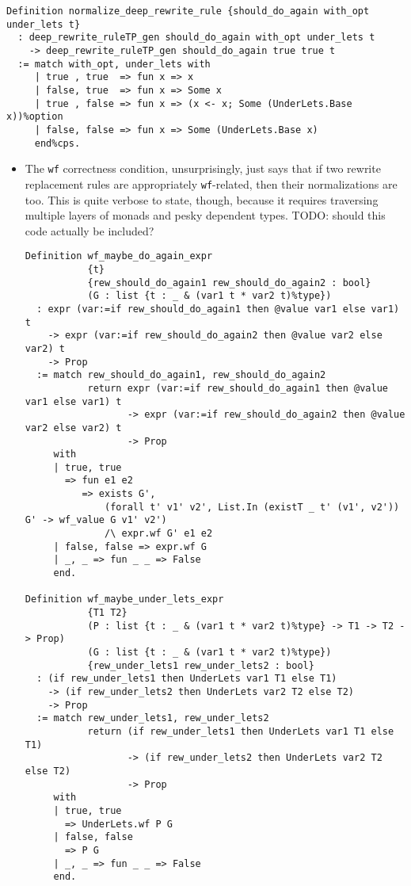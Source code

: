 \begin{itemize}
\begin{itemize}
\begin{verbatim}
Definition normalize_deep_rewrite_rule {should_do_again with_opt under_lets t}
  : deep_rewrite_ruleTP_gen should_do_again with_opt under_lets t
    -> deep_rewrite_ruleTP_gen should_do_again true true t
  := match with_opt, under_lets with
     | true , true  => fun x => x
     | false, true  => fun x => Some x
     | true , false => fun x => (x <- x; Some (UnderLets.Base x))%option
     | false, false => fun x => Some (UnderLets.Base x)
     end%cps.
\end{verbatim}

    \begin{itemize}
    \item
      The \texttt{wf} correctness condition, unsurprisingly, just says
      that if two rewrite replacement rules are appropriately
      \texttt{wf}-related, then their normalizations are too. This is
      quite verbose to state, though, because it requires traversing
      multiple layers of monads and pesky dependent types. TODO: should
      this code actually be included?

\begin{verbatim}
Definition wf_maybe_do_again_expr
           {t}
           {rew_should_do_again1 rew_should_do_again2 : bool}
           (G : list {t : _ & (var1 t * var2 t)%type})
  : expr (var:=if rew_should_do_again1 then @value var1 else var1) t
    -> expr (var:=if rew_should_do_again2 then @value var2 else var2) t
    -> Prop
  := match rew_should_do_again1, rew_should_do_again2
           return expr (var:=if rew_should_do_again1 then @value var1 else var1) t
                  -> expr (var:=if rew_should_do_again2 then @value var2 else var2) t
                  -> Prop
     with
     | true, true
       => fun e1 e2
          => exists G',
              (forall t' v1' v2', List.In (existT _ t' (v1', v2')) G' -> wf_value G v1' v2')
              /\ expr.wf G' e1 e2
     | false, false => expr.wf G
     | _, _ => fun _ _ => False
     end.

Definition wf_maybe_under_lets_expr
           {T1 T2}
           (P : list {t : _ & (var1 t * var2 t)%type} -> T1 -> T2 -> Prop)
           (G : list {t : _ & (var1 t * var2 t)%type})
           {rew_under_lets1 rew_under_lets2 : bool}
  : (if rew_under_lets1 then UnderLets var1 T1 else T1)
    -> (if rew_under_lets2 then UnderLets var2 T2 else T2)
    -> Prop
  := match rew_under_lets1, rew_under_lets2
           return (if rew_under_lets1 then UnderLets var1 T1 else T1)
                  -> (if rew_under_lets2 then UnderLets var2 T2 else T2)
                  -> Prop
     with
     | true, true
       => UnderLets.wf P G
     | false, false
       => P G
     | _, _ => fun _ _ => False
     end.


\end{verbatim}
\end{itemize}
\end{itemize}
\end{itemize}
